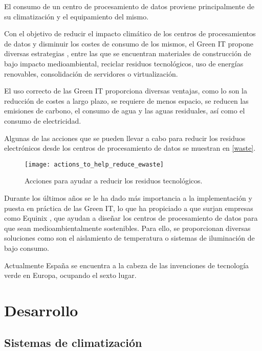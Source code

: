 El consumo de un centro de procesamiento de datos proviene principalmente de su climatización y el equipamiento del mismo.

Con el objetivo de reducir el impacto climático de los centros de procesamientos de datos y disminuir los costes de consumo de los mismos, el Green IT propone diversas estrategias \cite{techtargetgreen}, entre las que se encuentran materiales de construcción de bajo impacto medioambiental, reciclar residuos tecnológicos, uso de energías renovables, consolidación de servidores o virtualización.

El uso correcto de las Green IT proporciona diversas ventajas, como lo son la reducción de costes a largo plazo, se requiere de menos espacio, se reducen las emisiones de carbono, el consumo de agua y las aguas residuales, así como el consumo de electricidad.

Algunas de las acciones que se pueden llevar a cabo para reducir los residuos electrónicos desde los centros de procesamiento de datos se muestran en \eqref{waste}.

\begin{figure}
    \begin{center}
        \label{waste}
        \texttt{[image: actions\_to\_help\_reduce\_ewaste]}
        \caption{Acciones para ayudar a reducir los residuos tecnológicos.}
    \end{center}
\end{figure}

Durante los últimos años se le ha dado más importancia a la implementación y puesta en práctica de las Green IT, lo que ha propiciado a que surjan empresas como Equinix \cite{equinix}, que ayudan a diseñar los centros de procesamiento de datos para que sean medioambientalmente sostenibles. Para ello, se proporcionan diversas soluciones como son el aislamiento de temperatura o sistemas de iluminación de bajo consumo.

Actualmente España se encuentra a la cabeza de las invenciones de tecnología verde en Europa, ocupando el sexto lugar. 

\chapter{Desarrollo}

\section{Sistemas de climatización}

